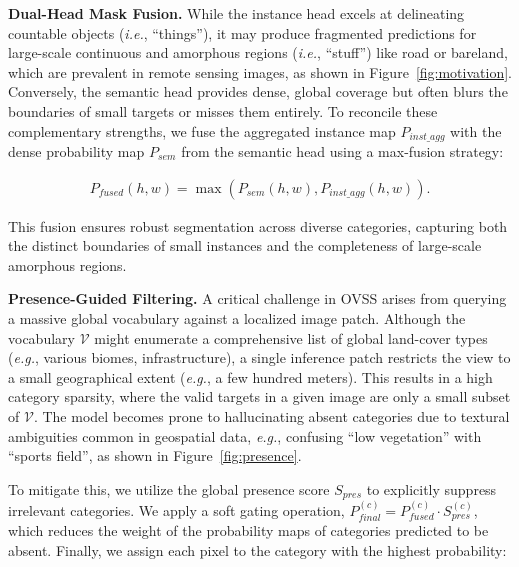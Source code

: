 \documentclass[twocolumn,switch,times]{article}
\begin{document}
\noindent
\textbf{Dual-Head Mask Fusion.}
While the instance head excels at delineating countable objects (\textit{i.e.}, ``things''), it may produce fragmented predictions for large-scale continuous and amorphous regions (\textit{i.e.}, ``stuff'') like road or bareland, which are prevalent in remote sensing images, as shown in Figure~\ref{fig:motivation}. Conversely, the semantic head provides dense, global coverage but often blurs the boundaries of small targets or misses them entirely. To reconcile these complementary strengths, we fuse the aggregated instance map $P_{inst\_agg}$ with the dense probability map $P_{sem}$ from the semantic head using a max-fusion strategy:

\begin{equation}
\begin{aligned}
  P_{fused}(h, w) = \max \left( P_{sem}(h, w), P_{inst\_agg}(h, w) \right).
  \label{eq:semantic}
\end{aligned}
\end{equation}

This fusion ensures robust segmentation across diverse categories, capturing both the distinct boundaries of small instances and the completeness of large-scale amorphous regions.


\noindent
\textbf{Presence-Guided Filtering.}
A critical challenge in OVSS arises from querying a massive global vocabulary against a localized image patch. Although the vocabulary $\mathcal{V}$ might enumerate a comprehensive list of global land-cover types (\textit{e.g.}, various biomes, infrastructure), a single inference patch restricts the view to a small geographical extent (\textit{e.g.}, a few hundred meters). This results in a high category sparsity, where the valid targets in a given image are only a small subset of $\mathcal{V}$. The model becomes prone to hallucinating absent categories due to textural ambiguities common in geospatial data, \textit{e.g.}, confusing ``low vegetation'' with ``sports field'', as shown in Figure~\ref{fig:presence}.

To mitigate this, we utilize the global presence score $S_{pres}$ to explicitly suppress irrelevant categories. We apply a soft gating operation, $P_{final}^{(c)} = P_{fused}^{(c)} \cdot S_{pres}^{(c)}$, which reduces the weight of the probability maps of categories predicted to be absent. Finally, we assign each pixel to the category with the highest probability:

\end{document}
